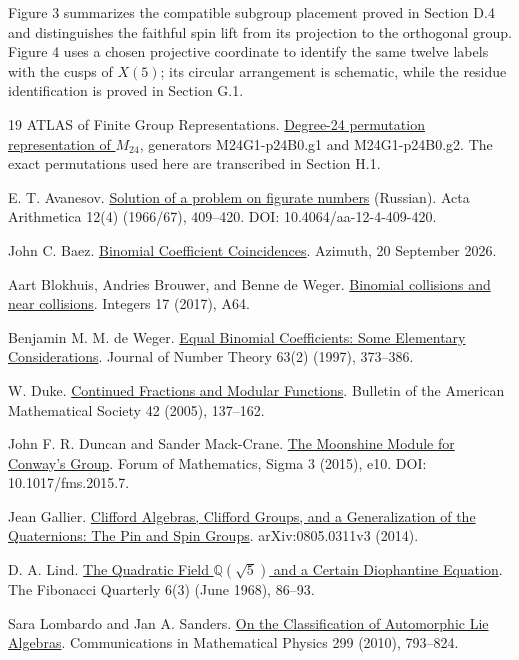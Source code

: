 \documentclass[11pt,a4paper]{article}
\begin{document}
Figure 3 summarizes the compatible subgroup placement proved in Section D.4 and distinguishes the faithful spin lift from its projection to the orthogonal group. Figure 4 uses a chosen projective coordinate to identify the same twelve labels with the cusps of \(X(5)\); its circular arrangement is schematic, while the residue identification is proved in Section G.1.

\begin{thebibliography}{19}
\setlength{\itemsep}{0.45em}
ATLAS of Finite Group Representations. \href{https://brauer.maths.qmul.ac.uk/Atlas/v3/permrep/M24G1-p24B0}{Degree-24 permutation representation of $M_{24}$}, generators M24G1-p24B0.g1 and M24G1-p24B0.g2. The exact permutations used here are transcribed in Section H.1.

E. T. Avanesov. \href{https://eudml.org/doc/204811}{Solution of a problem on figurate numbers} (Russian). Acta Arithmetica 12(4) (1966/67), 409--420. DOI: 10.4064/aa-12-4-409-420.

John C. Baez. \href{https://johncarlosbaez.wordpress.com/2026/09/20/binomial-coefficient-coincidences/}{Binomial Coefficient Coincidences}. Azimuth, 20 September 2026.

Aart Blokhuis, Andries Brouwer, and Benne de Weger. \href{https://math.colgate.edu/~integers/r64/r64.pdf}{Binomial collisions and near collisions}. Integers 17 (2017), A64.

Benjamin M. M. de Weger. \href{https://math.deweger.net/papers/%5B20%5DdW-EqBinom-JNumTh%5B1997%5D.pdf}{Equal Binomial Coefficients: Some Elementary Considerations}. Journal of Number Theory 63(2) (1997), 373--386.

W. Duke. \href{https://doi.org/10.1090/S0273-0979-05-01047-5}{Continued Fractions and Modular Functions}. Bulletin of the American Mathematical Society 42 (2005), 137--162.

John F. R. Duncan and Sander Mack-Crane. \href{https://doi.org/10.1017/fms.2015.7}{The Moonshine Module for Conway's Group}. Forum of Mathematics, Sigma 3 (2015), e10. DOI: 10.1017/fms.2015.7.

Jean Gallier. \href{https://arxiv.org/abs/0805.0311}{Clifford Algebras, Clifford Groups, and a Generalization of the Quaternions: The Pin and Spin Groups}. arXiv:0805.0311v3 (2014).

D. A. Lind. \href{https://www.fq.math.ca/Scanned/6-3/lind.pdf}{The Quadratic Field $\mathbb Q(\sqrt5)$ and a Certain Diophantine Equation}. The Fibonacci Quarterly 6(3) (June 1968), 86--93.

Sara Lombardo and Jan A. Sanders. \href{https://arxiv.org/abs/0912.1697}{On the Classification of Automorphic Lie Algebras}. Communications in Mathematical Physics 299 (2010), 793--824.

\end{thebibliography}
\end{document}
